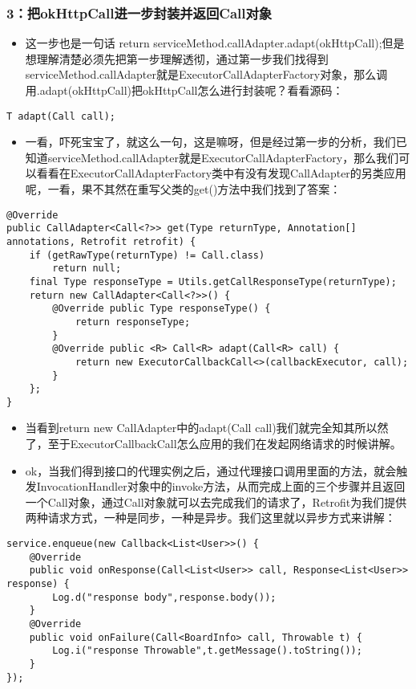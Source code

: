 \documentclass[9pt, b5paper]{article}
\begin{document}
\subsubsection{3：把okHttpCall进一步封装并返回Call对象}
\label{sec-1-3-3}
\begin{itemize}
\item 这一步也是一句话 return serviceMethod.callAdapter.adapt(okHttpCall);但是想理解清楚必须先把第一步理解透彻，通过第一步我们找得到serviceMethod.callAdapter就是ExecutorCallAdapterFactory对象，那么调用.adapt(okHttpCall)把okHttpCall怎么进行封装呢？看看源码：
\end{itemize}
\begin{verbatim}
T adapt(Call call);
\end{verbatim}
\begin{itemize}
\item 一看，吓死宝宝了，就这么一句，这是嘛呀，但是经过第一步的分析，我们已知道serviceMethod.callAdapter就是ExecutorCallAdapterFactory，那么我们可以看看在ExecutorCallAdapterFactory类中有没有发现CallAdapter的另类应用呢，一看，果不其然在重写父类的get()方法中我们找到了答案：
\end{itemize}
\begin{verbatim}
@Override
public CallAdapter<Call<?>> get(Type returnType, Annotation[] annotations, Retrofit retrofit) {
    if (getRawType(returnType) != Call.class) 
        return null;
    final Type responseType = Utils.getCallResponseType(returnType);
    return new CallAdapter<Call<?>>() {
        @Override public Type responseType() {
            return responseType;
        }
        @Override public <R> Call<R> adapt(Call<R> call) {
            return new ExecutorCallbackCall<>(callbackExecutor, call);
        }
    };
}
\end{verbatim}
\begin{itemize}
\item 当看到return new CallAdapter中的adapt(Call call)我们就完全知其所以然了，至于ExecutorCallbackCall怎么应用的我们在发起网络请求的时候讲解。
\item ok，当我们得到接口的代理实例之后，通过代理接口调用里面的方法，就会触发InvocationHandler对象中的invoke方法，从而完成上面的三个步骤并且返回一个Call对象，通过Call对象就可以去完成我们的请求了，Retrofit为我们提供两种请求方式，一种是同步，一种是异步。我们这里就以异步方式来讲解：
\end{itemize}
\begin{verbatim}
service.enqueue(new Callback<List<User>>() {
    @Override
    public void onResponse(Call<List<User>> call, Response<List<User>> response) {
        Log.d("response body",response.body());
    }
    @Override
    public void onFailure(Call<BoardInfo> call, Throwable t) {
        Log.i("response Throwable",t.getMessage().toString());
    }
});
\end{verbatim}
\end{document}
